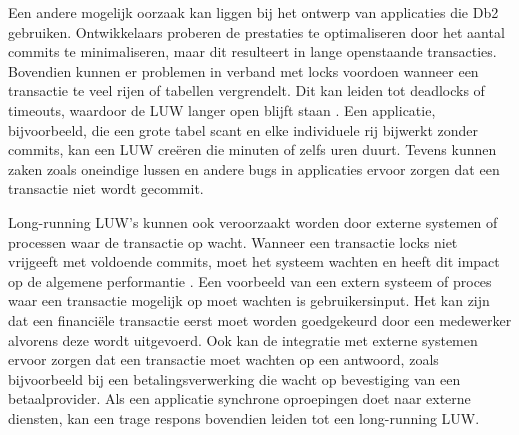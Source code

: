 Een andere mogelijk oorzaak kan liggen bij het ontwerp van applicaties die Db2 gebruiken.
Ontwikkelaars proberen de prestaties te optimaliseren door het aantal commits te minimaliseren, maar dit resulteert in lange openstaande transacties.
Bovendien kunnen er problemen in verband met locks voordoen wanneer een transactie te veel rijen of tabellen vergrendelt.
Dit kan leiden tot deadlocks of timeouts, waardoor de LUW langer open blijft staan \autocite{ibm_2026_lock_contention_suspension_deadlock_timeout}.
Een applicatie, bijvoorbeeld, die een grote tabel scant en elke individuele rij bijwerkt zonder commits, kan een LUW creëren die minuten of zelfs uren duurt.
Tevens kunnen zaken zoals oneindige lussen en andere bugs in applicaties ervoor zorgen dat een transactie niet wordt gecommit.

Long-running LUW's kunnen ook veroorzaakt worden door externe systemen of processen waar de transactie op wacht.
Wanneer een transactie locks niet vrijgeeft met voldoende commits, moet het systeem wachten en heeft dit impact op de algemene performantie \autocite{copplestonejones_2024_db2_locking_application_developers}.
Een voorbeeld van een extern systeem of proces waar een transactie mogelijk op moet wachten is gebruikersinput.
Het kan zijn dat een financiële transactie eerst moet worden goedgekeurd door een medewerker alvorens deze wordt uitgevoerd.
Ook kan de integratie met externe systemen ervoor zorgen dat een transactie moet wachten op een antwoord, zoals bijvoorbeeld bij een betalingsverwerking die wacht op bevestiging van een betaalprovider.
Als een applicatie synchrone oproepingen doet naar externe diensten, kan een trage respons bovendien leiden tot een long-running LUW.

\subsubsection{}
\label{sec:asynchrone-log-replicatie-impact-long-running-logical-units-of-work}

